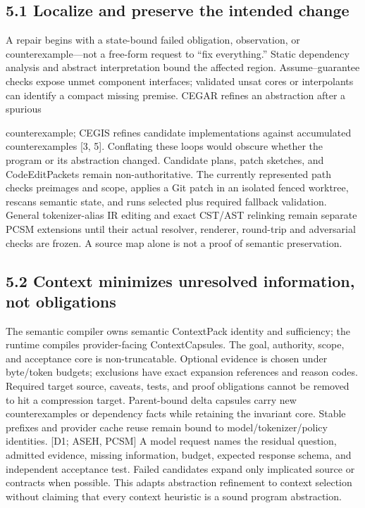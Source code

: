 \subsection*{5.1 Localize and preserve the intended change}

A repair begins with a state-bound failed obligation, observation, or counterexample—not a free-form
request to “fix everything.” Static dependency analysis and abstract interpretation bound the affected
region. Assume–guarantee checks expose unmet component interfaces; validated unsat cores or
interpolants can identify a compact missing premise. CEGAR refines an abstraction after a spurious


counterexample; CEGIS refines candidate implementations against accumulated counterexamples
[3, 5]. Conflating these loops would obscure whether the program or its abstraction changed.
Candidate plans, patch sketches, and CodeEditPackets remain non-authoritative. The currently
represented path checks preimages and scope, applies a Git patch in an isolated fenced worktree,
rescans semantic state, and runs selected plus required fallback validation. General tokenizer-alias IR
editing and exact CST/AST relinking remain separate PCSM extensions until their actual resolver,
renderer, round-trip and adversarial checks are frozen. A source map alone is not a proof of semantic
preservation.

\subsection*{5.2 Context minimizes unresolved information, not obligations}

The semantic compiler owns semantic ContextPack identity and sufficiency; the runtime compiles
provider-facing ContextCapsules. The goal, authority, scope, and acceptance core is non-truncatable.
Optional evidence is chosen under byte/token budgets; exclusions have exact expansion references
and reason codes. Required target source, caveats, tests, and proof obligations cannot be removed
to hit a compression target. Parent-bound delta capsules carry new counterexamples or dependency
facts while retaining the invariant core. Stable prefixes and provider cache reuse remain bound to
model/tokenizer/policy identities. [D1; ASEH, PCSM]
A model request names the residual question, admitted evidence, missing information, budget,
expected response schema, and independent acceptance test. Failed candidates expand only implicated
source or contracts when possible. This adapts abstraction refinement to context selection without
claiming that every context heuristic is a sound program abstraction.

